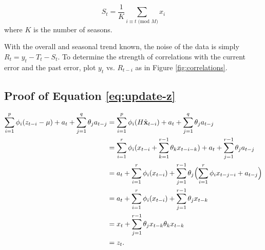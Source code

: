 \begin{equation}
S_t=\frac{1}{K}\sum_{i\equiv t\text{ (mod $M$)}}x_i
\end{equation}
where $K$ is the number of seasons.

With the overall and seasonal trend known, the noise of the data is simply $R_t=y_t-T_t-S_t$.
To determine the strength of correlations with the current error and the past error, plot $y_t$ vs. $R_{t-i}$ as in Figure \ref{fig:correlations}.

\subsection*{Proof of Equation \ref{eq:update-z}}
\begin{align}
    \sum_{i=1}^p\phi_i(z_{t-i}-\mu)+a_t+\sum_{j=1}^q\theta_ja_{t-j}&=\sum_{i=1}^p\phi_i(H\hat{\textbf{x}}_{t-i})+a_t+\sum_{j=1}^q\theta_ja_{t-j}\\
    &=\sum_{i=1}^r\phi_i(x_{t-i}+\sum_{k=1}^{r-1}\theta_kx_{t-i-k})+a_t+\sum_{j=1}^{r-1}\theta_ja_{t-j}\\
    &=a_t+\sum_{i=1}^r\phi_i(x_{t-i})+\sum_{j=1}^{r-1}\theta_j\Bigl(\sum_{i=1}^r\phi_ix_{t-j-i}+a_{t-j}\Bigr)\\
    &=a_t+\sum_{i=1}^r\phi_i(x_{t-i})+\sum_{j=1}^{r-1}\theta_jx_{t-k}\\
    &=x_t+\sum_{j=1}^{r-1}\theta_jx_{t-k}\theta_kx_{t-k}\\
    &=z_t.
\end{align}

